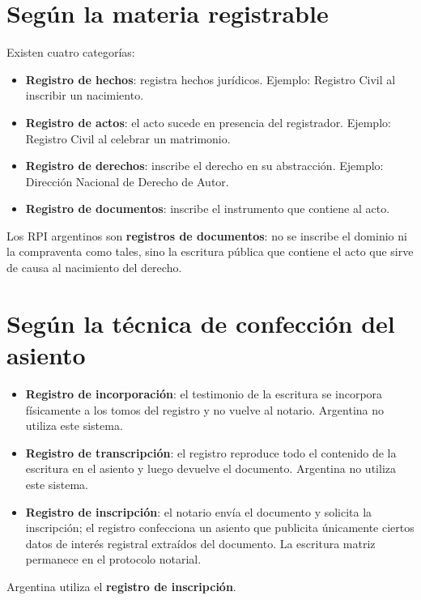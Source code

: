 \documentclass[12pt,oneside]{book}
\begin{document}
\section{Según la materia registrable}

Existen cuatro categorías:

\begin{itemize}
    \item \textbf{Registro de hechos}: registra hechos jurídicos. Ejemplo: Registro Civil al inscribir un nacimiento.
    \item \textbf{Registro de actos}: el acto sucede en presencia del registrador. Ejemplo: Registro Civil al celebrar un matrimonio.
    \item \textbf{Registro de derechos}: inscribe el derecho en su abstracción. Ejemplo: Dirección Nacional de Derecho de Autor.
    \item \textbf{Registro de documentos}: inscribe el instrumento que contiene al acto.
\end{itemize}

Los RPI argentinos son \textbf{registros de documentos}: no se inscribe el dominio ni la compraventa como tales, sino la escritura pública que contiene el acto que sirve de causa al nacimiento del derecho.

\section{Según la técnica de confección del asiento}

\begin{itemize}
    \item \textbf{Registro de incorporación}: el testimonio de la escritura se incorpora físicamente a los tomos del registro y no vuelve al notario. Argentina no utiliza este sistema.
    \item \textbf{Registro de transcripción}: el registro reproduce todo el contenido de la escritura en el asiento y luego devuelve el documento. Argentina no utiliza este sistema.
    \item \textbf{Registro de inscripción}: el notario envía el documento y solicita la inscripción; el registro confecciona un asiento que publicita únicamente ciertos datos de interés registral extraídos del documento. La escritura matriz permanece en el protocolo notarial.
\end{itemize}

Argentina utiliza el \textbf{registro de inscripción}.
\end{document}
